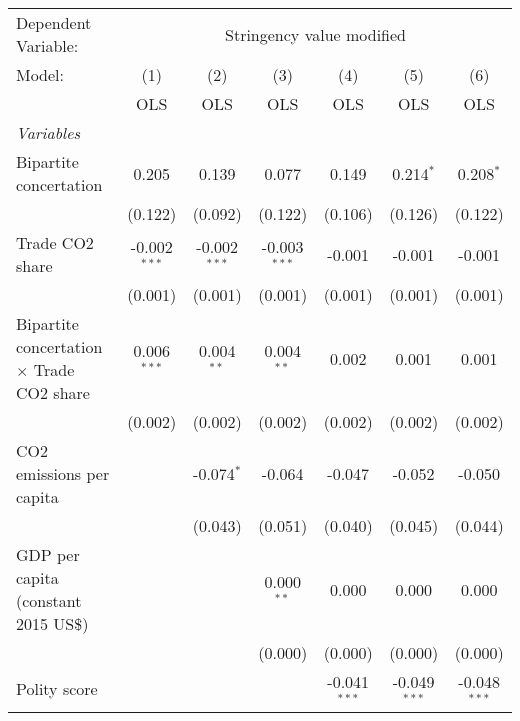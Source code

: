
\begingroup
\centering
\begin{tabular}{lcccccc}
   \toprule
   Dependent Variable: & \multicolumn{6}{c}{Stringency value modified}\\
   Model:                                           & (1)            & (2)            & (3)            & (4)            & (5)            & (6)\\  
                                                    &  OLS           & OLS            & OLS            & OLS            & OLS            & OLS\\  
   \midrule
   \emph{Variables}\\
   Bipartite concertation                           & 0.205          & 0.139          & 0.077          & 0.149          & 0.214$^{*}$    & 0.208$^{*}$\\   
                                                    & (0.122)        & (0.092)        & (0.122)        & (0.106)        & (0.126)        & (0.122)\\   
   Trade CO2 share                                  & -0.002$^{***}$ & -0.002$^{***}$ & -0.003$^{***}$ & -0.001         & -0.001         & -0.001\\   
                                                    & (0.001)        & (0.001)        & (0.001)        & (0.001)        & (0.001)        & (0.001)\\   
   Bipartite concertation $\times$ Trade CO2 share  & 0.006$^{***}$  & 0.004$^{**}$   & 0.004$^{**}$   & 0.002          & 0.001          & 0.001\\   
                                                    & (0.002)        & (0.002)        & (0.002)        & (0.002)        & (0.002)        & (0.002)\\   
   CO2 emissions per capita                         &                & -0.074$^{*}$   & -0.064         & -0.047         & -0.052         & -0.050\\   
                                                    &                & (0.043)        & (0.051)        & (0.040)        & (0.045)        & (0.044)\\   
   GDP per capita (constant 2015 US\$)              &                &                & 0.000$^{**}$   & 0.000          & 0.000          & 0.000\\   
                                                    &                &                & (0.000)        & (0.000)        & (0.000)        & (0.000)\\   
   Polity score                                     &                &                &                & -0.041$^{***}$ & -0.049$^{***}$ & -0.048$^{***}$\\   

\end{tabular}
